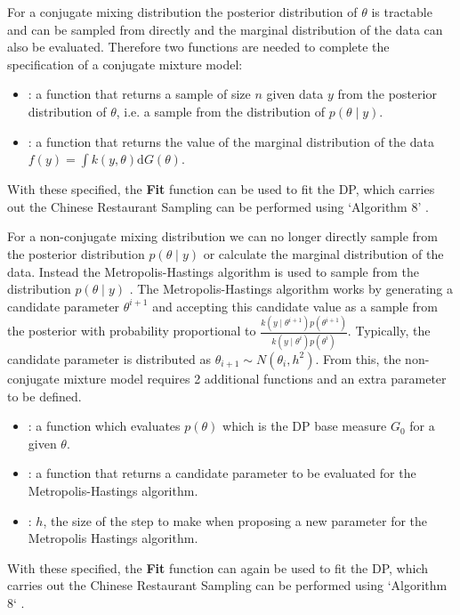 \documentclass[nojss]{jss}
\begin{document}
For a conjugate mixing distribution the posterior distribution of $\theta$ is tractable and can be sampled from directly and the marginal distribution of the data can also be evaluated. Therefore two functions are needed to complete the specification of a conjugate mixture model:
\begin{itemize}
\item {}: a function that returns a sample of size $n$ given data $y$ from the posterior distribution of $\theta$, i.e. a sample from the distribution of $p(\theta \mid y)$.
\item {}: a function that returns the value of the marginal distribution of the data $f(y) = \int k(y , \theta) \mathrm{d} G(\theta)$.
\end{itemize}

With these specified, the \textbf{Fit} function can be used to fit the DP, which carries out the Chinese Restaurant Sampling can be performed using `Algorithm 8' \citep{neal_markov_2000}.

For a non-conjugate mixing distribution we can no longer directly sample from the posterior distribution $p(\theta \mid y)$ or calculate the marginal distribution of the data. Instead the Metropolis-Hastings algorithm is used to sample from the distribution $p(\theta \mid y)$ \cite{hastings_monte_1970}. The Metropolis-Hastings algorithm works by generating a candidate parameter $\theta ^{i+1}$ and accepting this candidate value as a sample from the posterior with probability proportional to $\frac{k(y \mid \theta ^{i+1}) p(\theta ^{i+1})}{k(y \mid \theta^i) p(\theta^i)}$. Typically, the candidate parameter is distributed as $\theta _{i+1} \sim N(\theta _i, h^2)$. From this, the non-conjugate mixture model requires 2 additional functions and an extra parameter to be defined.
\begin{itemize}
\item {}: a function which evaluates $p(\theta)$ which is the DP base measure $G_0$ for a given $\theta$.
\item {}: a function that returns a candidate parameter to be evaluated for the Metropolis-Hastings algorithm.
\item {}: $h$, the size of the step to make when proposing a new parameter for the Metropolis Hastings algorithm.
\end{itemize}

With these specified, the \textbf{Fit} function can again be used to fit the DP, which carries out the Chinese Restaurant Sampling can be performed using `Algorithm 8` \citep{neal_markov_2000}.
\end{document}
